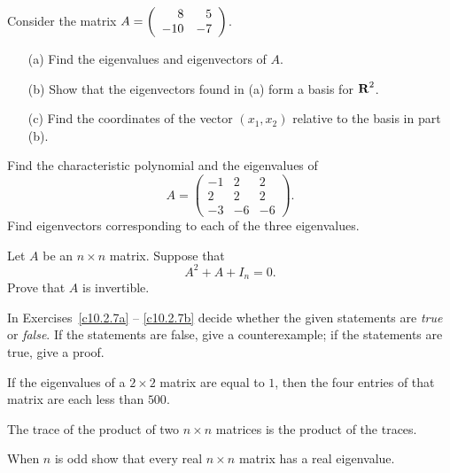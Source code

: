 \documentclass{ximera}
\begin{document}
\begin{exercise} \label{c10.2.4}
Consider the matrix $A=\left(\begin{array}{rr} 8 & 5\\ -10 &-7\end{array}\right)$.
\begin{itemize}
\item[(a)] Find the eigenvalues and eigenvectors of $A$.
\item[(b)] Show that the eigenvectors found in (a) form a basis for $\mbox{$\bf{R}$}^2$.
\item[(c)] Find the coordinates of the vector $(x_1,x_2)$ relative to the 
basis in part (b).
\end{itemize}
\end{exercise}

\begin{exercise} \label{c10.2.5}
Find the characteristic polynomial and the eigenvalues of 
\[
A = \left(\begin{array}{rrr} -1 & 2 & 2 \\ 2 & 2 & 2 \\ -3 & -6 & -6 
\end{array}\right).
\]
Find eigenvectors corresponding to each of the three eigenvalues.
\end{exercise}

\begin{exercise} \label{c10.2.6}
Let $A$ be an $n\times n$ matrix.  Suppose that 
\[
A^2 + A + I_n = 0.
\]
Prove that $A$ is invertible.
\end{exercise}

\noindent In Exercises~\ref{c10.2.7a} -- \ref{c10.2.7b} decide whether 
the given statements are {\em true\/} or {\em false\/}. If the 
statements are false, give a counterexample; if the statements are true, 
give a proof.
\begin{exercise} \label{c10.2.7a}
If the eigenvalues of a $2\times 2$ matrix are equal to $1$,
then the four entries of that matrix are each less than $500$.
\end{exercise}
\begin{exercise} \label{c10.2.7b}
The trace of the product of two $n\times n$ matrices is the
product of the traces.
\end{exercise}

\begin{exercise} \label{c10.2.8}
When $n$ is odd show that every real $n\times n$ matrix has a real
eigenvalue. 
\end{exercise}

\CEXER
\end{document}
